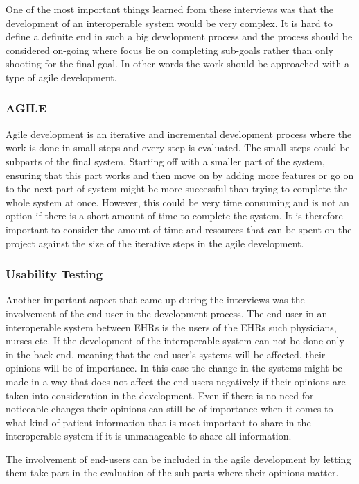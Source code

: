\documentclass[14pt]{article}
\begin{document}
One of the most important things learned from these interviews was that the development of an interoperable system would be very complex. It is hard to define a definite end in such a big development process and the process should be considered on-going where focus lie on completing sub-goals rather than only shooting for the final goal. In other words the work should be approached with a type of agile development. 

\subsubsection{AGILE}
Agile development is an iterative and incremental development process where the work is done in small steps and every step is evaluated. The small steps could be subparts of the final system. Starting off with a smaller part of the system, ensuring that this part works and then move on by adding more features or go on to the next part of system might be more successful than trying to complete the whole system at once. However, this could be very time consuming and is not an option if there is a short amount of time to complete the system. It is therefore important to consider the amount of time and resources that can be spent on the project against the size of the iterative steps in the agile development.

\subsubsection{Usability Testing}
Another important aspect that came up during the interviews was the involvement of the end-user in the development process. The end-user in an interoperable system between \glspl{EHR} is the users of the \glspl{EHR} such physicians, nurses etc. If the development of the interoperable system can not be done only in the back-end, meaning that the end-user's systems will be affected, their opinions will be of importance. In this case the change in the systems might be made in a way that does not affect the end-users negatively if their opinions are taken into consideration in the development. Even if there is no need for noticeable changes their opinions can still be of importance when it comes to what kind of patient information that is most important to share in the interoperable system if it is unmanageable to share all information. 

The involvement of end-users can be included in the agile development by letting them take part in the evaluation of the sub-parts where their opinions matter. 
\end{document}
